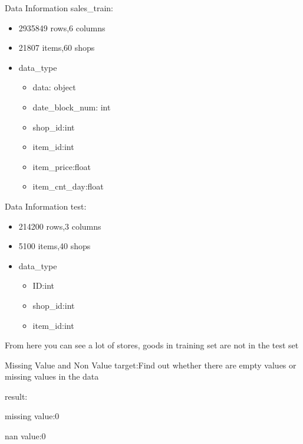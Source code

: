 \documentclass[
 size=14pt,
 paper=smartboard,  %
 mode=present, 		%
 display=slides, 	%
 style=tuliplab,  	%
 pauseslide,
 fleqn,leqno]{powerdot}
\begin{document}
\begin{slide}[toc=,bm=]{Data Information}
  sales_train:\par
    \begin{itemize}
      \item 2935849 rows,6 columns
      \item 21807 items,60 shops
      \item data_type
            \begin{itemize}
              \item data: object
              \item date_block_num: int
              \item shop_id:int
              \item item_id:int
              \item item_price:float
              \item item_cnt_day:float
            \end{itemize}
    \end{itemize}
\end{slide}


\begin{slide}[toc=,bm=]{Data Information}
  test:\par
    \begin{itemize}
      \item 214200 rows,3 columns
      \item 5100 items,40 shops
      \item data_type
            \begin{itemize}
              \item ID:int
              \item shop_id:int
              \item item_id:int
            \end{itemize}
    \end{itemize}
    From here you can see a lot of stores, goods in training set are not in the test set
\end{slide}



\begin{slide}[toc=,bm=]{Missing Value and Non Value}
  target:Find out whether there are empty values or missing values in the data\par
  result:\par
  missing value:0\par
  nan value:0\par
\end{slide}
\end{document}
